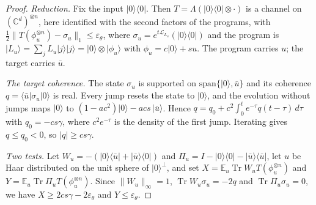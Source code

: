 \documentclass[11pt]{article}
\theoremstyle{remark}
\newcommand{\Lind}{\mathcal{L}}
\newcommand{\tn}[1]{\lVert #1 \rVert_1}
\newcommand{\ket}[1]{\lvert #1 \rangle}
\newcommand{\bra}[1]{\langle #1 \rvert}
\newcommand{\proj}[1]{\lvert #1 \rangle\langle #1 \rvert}
\begin{document}
\begin{proof}
\emph{Reduction.} Fix the input $\proj{0}$. Then $T = \Lambda(\proj{0} \otimes \cdot)$ is a channel on $(\mathbb{C}^d)^{\otimes n}$, here identified with the second factors of the programs, with $\tfrac12\tn{T(\phi_u^{\otimes n}) - \sigma_u} \le \varepsilon_\theta$, where $\sigma_u = e^{t\Lind_{L_u}}(\proj{0})$ and the program is $\ket{L_u} = \sum_j L_u\ket{j}\ket{j} = \ket{0} \otimes \ket{\phi_u}$ with $\phi_u = c\ket{0} + s u$. The program carries $u$; the target carries $\bar u$.

\emph{The target coherence.} The state $\sigma_u$ is supported on $\mathrm{span}\{\ket{0}, \bar u\}$ and its coherence $q = \bra{\bar u}\sigma_u\ket{0}$ is real. Every jump resets the state to $\ket{0}$, and the evolution without jumps maps $\ket{0}$ to $(1-ac^2)\ket{0} - acs\,\ket{\bar u}$. Hence $q = q_0 + c^2\int_0^t e^{-\tau} q(t-\tau)\,d\tau$ with $q_0 = -cs\gamma$, where $c^2e^{-\tau}$ is the density of the first jump. Iterating gives $q \le q_0 < 0$, so $\lvert q\rvert \ge cs\gamma$.

\emph{Two tests.} Let $W_u = -(\ket{0}\bra{\bar u} + \ket{\bar u}\bra{0})$ and $\Pi_u = I - \proj{0} - \proj{\bar u}$, let $u$ be Haar distributed on the unit sphere of $\ket{0}^\perp$, and set $X = \mathbb{E}_u \operatorname{Tr} W_u T(\phi_u^{\otimes n})$ and $Y = \mathbb{E}_u \operatorname{Tr} \Pi_u T(\phi_u^{\otimes n})$. Since $\lVert W_u\rVert_\infty = 1$, $\operatorname{Tr} W_u\sigma_u = -2q$ and $\operatorname{Tr}\Pi_u\sigma_u = 0$, we have $X \ge 2cs\gamma - 2\varepsilon_\theta$ and $Y \le \varepsilon_\theta$.


\end{proof}
\end{document}
